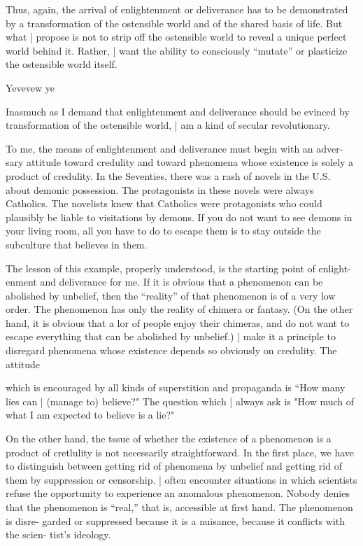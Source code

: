Thus, again, the arrival of enlightenment or deliverance has to be demonstrated 
by a transformation of the ostensible world and of the shared basis of life. But what 
| propose is not to strip off the ostensible world to reveal a unique perfect world 
behind it. Rather, | want the ability to consciously “mutate” or plasticize the 
ostensible world itself. 


Yevevew ye 


Inasmuch as I demand that enlightenment and deliverance should be evinced 
by transformation of the ostensible world, | am a kind of secular revolutionary. 

To me, the means of enlightenment and deliverance must begin with an adver- 
sary attitude toward credulity and toward phenomena whose existence is solely a 
product of credulity. In the Seventies, there was a rash of novels in the U.S. about 
demonic possession. The protagonists in these novels were always Catholics. The 
novelists knew that Catholics were protagonists who could plausibly be liable to 
visitations by demons. If you do not want to see demons in your living room, 
all you have to do to escape them is to stay outside the subculture that believes 
in them. 

The lesson of this example, properly understood, is the starting point of enlight- 
enment and deliverance for me. If it is obvious that a phenomenon can be 
abolished by unbelief, then the “reality” of that phenomenon is of a very low order. 
The phenomenon has only the reality of chimera or fantasy. (On the other hand, it 
is obvious that a lor of people enjoy their chimeras, and do not want to escape 
everything that can be abolished by unbelief.) | make it a principle to disregard 
phenomena whose existence depends so obviously on credulity. The attitude 


which is encouraged by all kinds of superstition and propaganda is “How many lies 
can | (manage to) believe?" The question which | always ask is "How much of what 
I am expected to believe is a lie?" 

On the other hand, the tssue of whether the existence of a phenomenon is 
a product of cretlulity is not necessarily straightforward. In the first place, we have to 
distinguish between getting rid of phenomena by unbelief and getting rid of them by 
suppression or censorship. | often encounter situations in which scientists refuse the 
opportunity to experience an anomalous phenomenon. Nobody denies that the 
phenomenon is “real,” that is, accessible at first hand. The phenomenon is disre- 
garded or suppressed because it is a nuisance, because it conflicts with the scien- 
tist’s ideology. 

